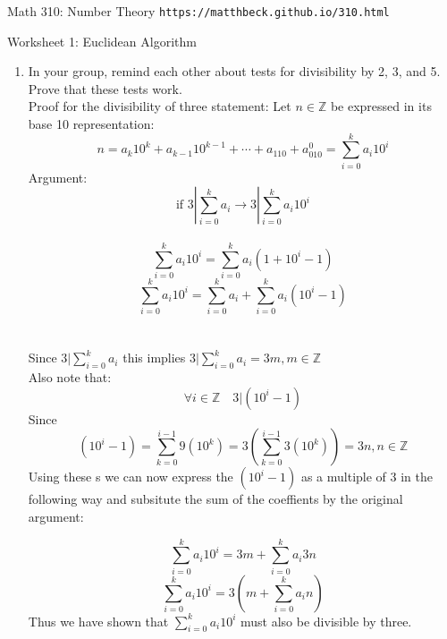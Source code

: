 \documentclass[11pt]{article}
\def\Z{\mathbb{Z}}
\begin{document}
\setlength{\parindent}{0pt}
\setlength{\parskip}{0.2cm}

$\mbox{}$
\vspace{-1in}

{ Math 310: Number Theory}
\hfill
{\tt https://matthbeck.github.io/310.html}

\vspace{.3in}




\begin{center}
\Large{Worksheet 1: Euclidean Algorithm}
\end{center}

\begin{enumerate}

\item In your group, remind each other about tests for divisibility by 2, 3, and 5.
Prove that these tests work.\\

  Proof for the divisibility of three statement:
  Let $n \in \Z$ be expressed in its base 10 representation:
  \[
    n=a_k10^k+a_{k-1}10^{k-1}+\cdots+a_110+a_010^0=\sum_{i=0}^ka_i10^i
  \]
  Argument:  $$\text{if } 3| \sum_{i=0}^ka_i \rightarrow  3|\sum_{i=0}^ka_i10^i$$\\
  \[
    \sum_{i=0}^ka_i10^i=\sum_{i=0}^ka_i(1+10^i-1)
  \]
  \[
    \sum_{i=0}^ka_i10^i=\sum_{i=0}^ka_i+\sum_{i=0}^ka_i(10^i-1)
  \]\\\\
Since $3| \sum_{i=0}^ka_i$ this implies $3| \sum_{i=0}^ka_i=3m,m\in \Z$\\
Also note that: \[
  \forall i\in \Z \quad 3|(10^i-1)
\]
Since \[
  (10^i-1)=\sum_{k=0}^{i-1}9(10^k)=3(\sum_{k=0}^{i-1}3(10^k))=3n,n \in \Z
\]
Using these s we can now express the $(10^i-1)$ as a multiple of 3 in the following way and subsitute the sum of the coeffients by the original argument:

\[
  \sum_{i=0}^ka_i10^i=3m+\sum_{i=0}^ka_i3n
\]
\[
    \sum_{i=0}^ka_i10^i=3(m+\sum_{i=0}^ka_in)
\]
Thus we have shown that $\sum_{i=0}^ka_i10^i$ must also be divisible by three.


\end{enumerate}
\end{document}

